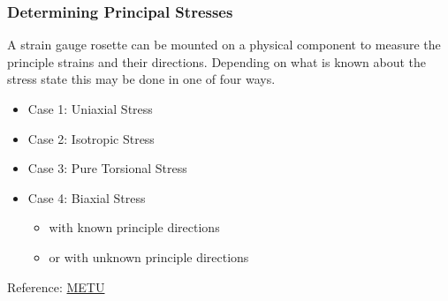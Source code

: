\documentclass[fleqn]{beamer} %
\newcommand{\sectionIIIsubsectionIIItitle}{Determining Principal Stresses}
\begin{document}
			\begin{frame}[containsverbatim]
				\frametitle{\sectionIIIsubsectionIIItitle}\scriptsize

				A strain gauge rosette can be mounted on a physical component to measure the principle strains and their directions. Depending on what is known about the stress state this may be done in one of four ways.

				\begin{itemize}
				\item Case 1: Uniaxial Stress \vspc
				\item Case 2: Isotropic Stress \vspc
				\item Case 3: Pure Torsional Stress \vspc
				\item Case 4: Biaxial Stress 
					\begin{itemize}
						\item with known principle directions 
						\item or with unknown principle directions 
					\end{itemize}
				\end{itemize}

				\vspace{2mm}
				{\tiny Reference: \href{http://courses.me.metu.edu.tr/courses/me410/exp5/ME410_exp5_theory.pdf}{METU}}
				
			\end{frame}
\end{document}
